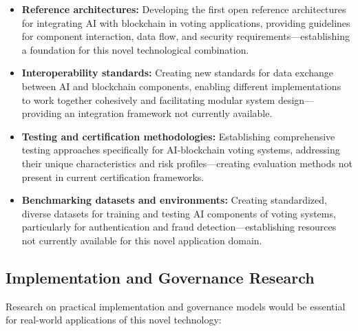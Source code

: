 \documentclass[conference]{IEEEtran}
\begin{document}
\begin{itemize}
    \item \textbf{Reference architectures:} Developing the first open reference architectures for integrating AI with blockchain in voting applications, providing guidelines for component interaction, data flow, and security requirements—establishing a foundation for this novel technological combination.
    
    \item \textbf{Interoperability standards:} Creating new standards for data exchange between AI and blockchain components, enabling different implementations to work together cohesively and facilitating modular system design—providing an integration framework not currently available.
    
    \item \textbf{Testing and certification methodologies:} Establishing comprehensive testing approaches specifically for AI-blockchain voting systems, addressing their unique characteristics and risk profiles—creating evaluation methods not present in current certification frameworks.
    
    \item \textbf{Benchmarking datasets and environments:} Creating standardized, diverse datasets for training and testing AI components of voting systems, particularly for authentication and fraud detection—establishing resources not currently available for this novel application domain.
\end{itemize}

\subsection{Implementation and Governance Research}
Research on practical implementation and governance models would be essential for real-world applications of this novel technology:
\end{document}

